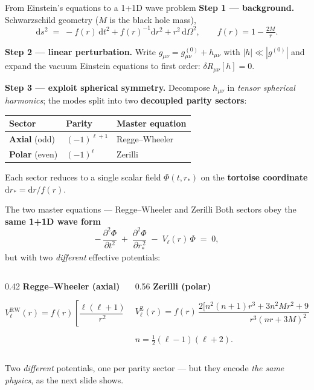 \documentclass[aspectratio=169, 11pt]{beamer}
\newcommand{\bh}{black hole}
\newcommand{\rw}{Regge--Wheeler}
\newcommand{\zer}{Zerilli}
\begin{document}
\begin{frame}{From Einstein's equations to a 1+1D wave problem}
  \textbf{Step 1 --- background.} Schwarzschild geometry ($M$ is the \bh{} mass),
  \[
    \mathrm{d} s^{2} \;=\; -f(r)\,\mathrm{d} t^{2} + f(r)^{-1}\mathrm{d} r^{2}
                     + r^{2}\,\mathrm{d}\Omega^{2},
    \qquad f(r) = 1 - \tfrac{2M}{r}.
  \]

  \textbf{Step 2 --- linear perturbation.} Write
  $g_{\mu\nu} = g^{(0)}_{\mu\nu} + h_{\mu\nu}$ with $|h| \ll |g^{(0)}|$ and
  expand the vacuum Einstein equations to first order:
  $\delta R_{\mu\nu}[h] = 0$.

  \textbf{Step 3 --- exploit spherical symmetry.} Decompose $h_{\mu\nu}$ in
  \emph{tensor spherical harmonics}; the modes split into two
  \textbf{decoupled parity sectors}:
  \medskip
  \begin{center}\small
  \begin{tabular}{lll}
    \toprule
    Sector & Parity & Master equation \\ \midrule
    \textbf{Axial} (odd) & $(-1)^{\ell+1}$ & \rw{} \\
    \textbf{Polar} (even)& $(-1)^{\ell}$   & \zer{} \\
    \bottomrule
  \end{tabular}
  \end{center}
  \medskip
  Each sector reduces to a single scalar field $\Phi(t,r_{\!*})$ on the
  \textbf{tortoise coordinate} $\mathrm{d} r_{\!*} = \mathrm{d} r/f(r)$.
\end{frame}

\begin{frame}{The two master equations --- \rw{} and \zer{}}
  Both sectors obey the \textbf{same 1+1D wave form}
  \[
    -\,\frac{\partial^{2}\Phi}{\partial t^{2}}
    \;+\; \frac{\partial^{2}\Phi}{\partial r_{\!*}^{\,2}}
    \;-\; V_{\ell}(r)\,\Phi \;=\; 0 ,
  \]
  but with two \emph{different} effective potentials:
  \medskip
  \begin{columns}[T]
    \begin{column}{0.42\textwidth}
      \centering\textbf{\rw{} (axial)}\par\medskip
      \[
        V^{\mathrm{RW}}_{\ell}(r) = f(r)\!\left[\frac{\ell(\ell{+}1)}{r^{2}} - \frac{6M}{r^{3}}\right]
      \]
    \end{column}
    \begin{column}{0.56\textwidth}
      \centering\textbf{\zer{} (polar)}\par\medskip
      \[
        V^{\mathrm{Z}}_{\ell}(r) = f(r)\,\frac{2\bigl[n^{2}(n{+}1)r^{3}+3n^{2}Mr^{2}+9nM^{2}r+9M^{3}\bigr]}{r^{3}(nr+3M)^{2}}
      \]
      {\centering\scriptsize $n = \tfrac{1}{2}(\ell-1)(\ell+2)$.\par}
    \end{column}
  \end{columns}
  \vfill
  \footnotesize
  Two \emph{different} potentials, one per parity sector --- but they encode
  \emph{the same physics}, as the next slide shows.
\end{frame}
\end{document}
